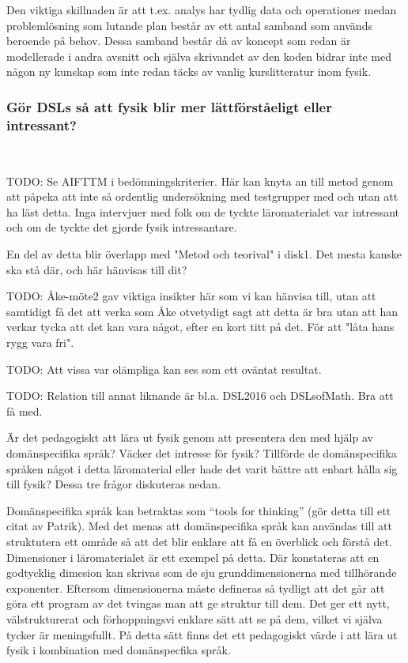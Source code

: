 \begin{binge}
Den viktiga skillnaden är att t.ex. analys har tydlig data och operationer 
medan problemlösning som lutande plan består av ett antal samband som används
beroende på behov. Dessa samband består då av koncept som redan är modellerade i
andra avsnitt och själva skrivandet av den koden bidrar inte med någon ny
kunskap som inte redan täcks av vanlig kurslitteratur inom fysik.

\subsubsection{Gör DSLs så att fysik blir mer lättförståeligt eller
intressant?}~\label{sec:bara_fysik}

TODO: Se AIFTTM i bedömningskriterier. Här kan knyta an till metod genom att påpeka att inte så ordentlig undersökning med testgrupper med och utan att ha läst detta. Inga intervjuer med folk om de tyckte läromaterialet var intressant och om de tyckte det gjorde fysik intressantare.

En del av detta blir överlapp med "Metod och teorival" i disk1. Det mesta kanske ska stå där, och här hänvisas till dit?

TODO: Åke-möte2 gav viktiga insikter här som vi kan hänvisa till, utan att samtidigt få det att verka som Åke otvetydigt sagt att detta är bra utan att han verkar tycka att det kan vara något, efter en kort titt på det. För att "låta hans rygg vara fri".

TODO: Att vissa var olämpliga kan ses som ett oväntat resultat.

TODO: Relation till annat liknande är bl.a. DSL2016 och DSLsofMath. Bra att få med.

Är det pedagogiskt att lära ut fysik genom att presentera den med hjälp av domänspecifika språk? Väcker det intresse för fysik? Tillförde de domänspecifika språken något i detta läromaterial eller hade det varit bättre att enbart hålla sig till fysik? Dessa tre frågor diskuteras nedan.

Domänspecifika språk kan betraktas som ``tools for thinking'' (gör detta till ett citat av Patrik). Med det menas att domänspecifika språk kan användas till att struktutera ett område så att det blir enklare att få en överblick och förstå det. Dimensioner i läromaterialet är ett exempel på detta. Där konstateras att en godtycklig dimesion kan skrivas som de sju grunddimensionerna med tillhörande exponenter. Eftersom dimensionerna måste defineras så tydligt att det går att göra ett program av det tvingas man att ge struktur till dem. Det ger ett nytt, välstrukturerat och förhoppningsvi enklare sätt att se på dem, vilket vi själva tycker är meningsfullt. På detta sätt finns det ett pedagogiskt värde i att lära ut fysik i kombination med domänspecfika språk.


\end{binge}
